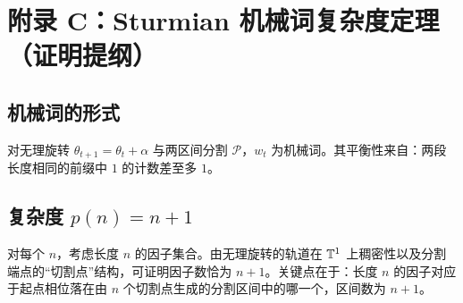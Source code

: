 \section{附录 C：Sturmian 机械词复杂度定理（证明提纲）}
\label{app:sturmian-outline}

\subsection{机械词的形式}

对无理旋转 $\theta_{t+1}=\theta_t+\alpha$ 与两区间分割 $\mathcal{P}$，$w_t$ 为机械词。其平衡性来自：两段长度相同的前缀中 $1$ 的计数差至多 $1$。

\subsection{\texorpdfstring{复杂度 $p(n)=n+1$}{复杂度 p(n)=n+1}}

对每个 $n$，考虑长度 $n$ 的因子集合。由无理旋转的轨道在 $\mathbb{T}^1$ 上稠密性以及分割端点的“切割点”结构，可证明因子数恰为 $n+1$。关键点在于：长度 $n$ 的因子对应于起点相位落在由 $n$ 个切割点生成的分割区间中的哪一个，区间数为 $n+1$。

